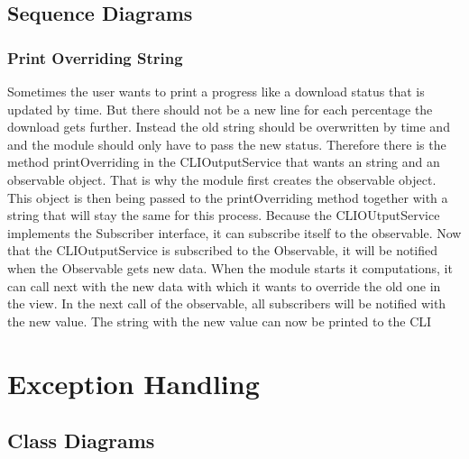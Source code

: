 \documentclass[parskip=full]{scrartcl}
\begin{document}
\newpage

\subsection{Sequence Diagrams}

\subsubsection{Print Overriding String}

\begin{figure}[h]
\begin{center}

\label{Print Overriding String}
\end{center}
\end{figure}
\newpage

Sometimes the user wants to print a progress like a download status that is updated by time.
But there should not be a new line for each percentage the download gets further.
Instead the old string should be overwritten by time and and the module should only have to pass the new status.
Therefore there is the method printOverriding in the CLIOutputService that wants an string and an observable object.
That is why the module first creates the observable object.
This object is then being passed to the printOverriding method together with a string that will stay the same for this process.
Because the CLIOUtputService implements the Subscriber interface, it can subscribe itself to the observable.
Now that the CLIOutputService is subscribed to the Observable, it will be notified when the Observable gets new data.
When the module starts it computations, it can call next with the new data with which it wants to override the old one in the view.
In the next call of the observable, all subscribers will be notified with the new value.
The string with the new value can now be printed to the \gls{CLI}

\newpage

\section{Exception Handling}

\subsection{Class Diagrams}
\end{document}
